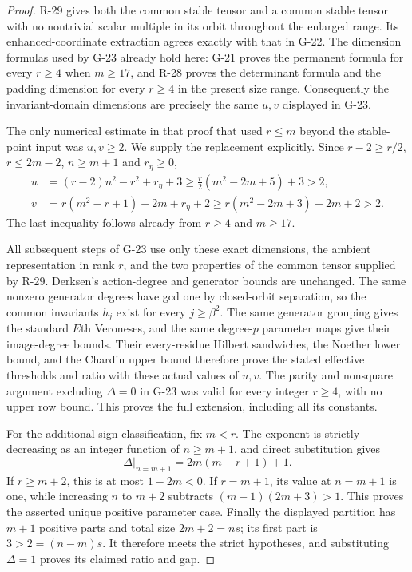 \begin{proof}
R-29 gives both the common stable tensor and a common stable tensor
with no nontrivial scalar multiple in its orbit throughout the
enlarged range. Its enhanced-coordinate extraction agrees exactly
with that in G-22. The dimension formulas used by G-23 already
hold here: G-21 proves the permanent formula for every $r\ge4$
when $m\ge17$, and R-28 proves the determinant formula and the
padding dimension for every $r\ge4$ in the present size range.
Consequently the invariant-domain dimensions are precisely the
same $u,v$ displayed in G-23.

The only numerical estimate in that proof that used $r\le m$
beyond the stable-point input was $u,v\ge2$. We supply the
replacement explicitly. Since $r-2\ge r/2$, $r\le2m-2$,
$n\ge m+1$ and $r_\eta\ge0$,
\[
 \begin{aligned}
 u&=(r-2)n^2-r^2+r_\eta+3
       \ge\frac r2(m^2-2m+5)+3>2,\\
 v&=r(m^2-r+1)-2m+r_\eta+2
       \ge r(m^2-2m+3)-2m+2>2.
 \end{aligned}
\]
The last inequality follows already from $r\ge4$ and $m\ge17$.

All subsequent steps of G-23 use only these exact dimensions,
the ambient representation in rank $r$, and the two properties
of the common tensor supplied by R-29. Derksen's action-degree
and generator bounds are unchanged. The same nonzero generator
degrees have gcd one by closed-orbit separation, so the common
invariants $h_j$ exist for every $j\ge\beta^2$. The same
generator grouping gives the standard $E$th Veroneses, and the
same degree-$p$ parameter maps give their image-degree bounds.
Their every-residue Hilbert sandwiches, the Noether lower bound,
and the Chardin upper bound therefore prove the stated effective
thresholds and ratio with these actual values of $u,v$.
The parity and nonsquare argument excluding $\Delta=0$ in G-23
was valid for every integer $r\ge4$, with no upper row bound.
This proves the full extension, including all its constants.

For the additional sign classification, fix $m<r$.
The exponent is strictly decreasing as an integer function of
$n\ge m+1$, and direct substitution gives
\[
       \Delta\big|_{n=m+1}=2m(m-r+1)+1.
\]
If $r\ge m+2$, this is at most $1-2m<0$.
If $r=m+1$, its value at $n=m+1$ is one, while increasing $n$
to $m+2$ subtracts $(m-1)(2m+3)>1$. This proves the asserted
unique positive parameter case. Finally the displayed partition
has $m+1$ positive parts and total size $2m+2=ns$; its first
part is $3>2=(n-m)s$. It therefore meets the strict hypotheses,
and substituting $\Delta=1$ proves its claimed ratio and gap.
\end{proof}

